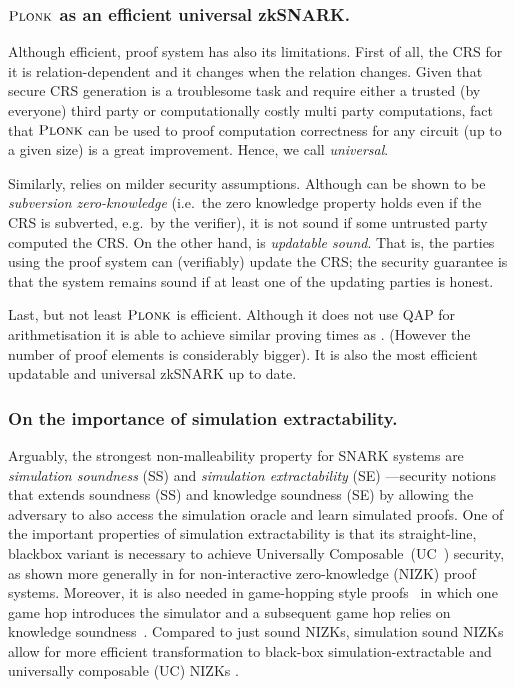 \documentclass[runningheads,11pt]{llncs}
\begin{document}
	\subsubsection*{$\textsc{Plonk}$ as an efficient universal zkSNARK.}
	Although efficient, \groth{} proof system has also its limitations. First of all, the CRS for it is relation-dependent and it changes when the relation changes. Given that secure CRS generation is a troublesome task and require either a trusted (by everyone) third party or computationally costly multi party computations, fact that $\textsc{Plonk}$ can be used to proof computation correctness for any circuit (up to a given size) is a great improvement. Hence, we call \plonk{} \emph{universal}.
	
	Similarly, \plonk{} relies on milder security assumptions. 
	Although \groth{} can be shown to be \emph{subversion zero-knowledge} (i.e.~the zero knowledge property holds even if the CRS is subverted, e.g.~by the verifier), it is not sound if some untrusted party computed the CRS. 
	On the other hand, \plonk{} is \emph{updatable sound}. That is, the parties using the proof system can (verifiably) update the CRS; the security guarantee is that the system remains sound if at least one of the updating parties is honest.
	
	Last, but not least $\textsc{Plonk}$ is efficient. Although it does not use QAP for arithmetisation it is able to achieve similar proving times as \groth{}. (However the number of proof elements is considerably bigger). 
	It is also the most efficient updatable and universal zkSNARK up to date.
	
	\subsubsection*{On the importance of simulation extractability.}
	Arguably, the strongest non-malleability property for SNARK systems are \emph{simulation soundness} (SS) and \emph{simulation extractability} (SE) \cite{FOCS:Sahai99,C:DDOPS01}---security notions that extends soundness (SS) and knowledge soundness (SE) by allowing the adversary to also access the simulation oracle and learn simulated proofs. 
	One of the important properties of simulation extractability is that its
	straight-line, blackbox variant is necessary to achieve Universally Composable~(UC~\cite{FOCS:Canetti01}) security, as shown more generally in 	\cite{STOC:CLOS02,AC:Groth06,EC:GroOstSah06} for non-interactive zero-knowledge (NIZK) proof systems. Moreover, it is also needed in game-hopping style proofs~\cite{EPRINT:Shoup04} in which one game hop
	introduces the simulator and a subsequent game hop relies on knowledge
	soundness~\cite{SP:KMSWP16,CCS:CamDriDub17}.
	Compared to just sound NIZKs, simulation sound NIZKs allow for more efficient transformation to black-box simulation-extractable and universally composable (UC) NIZKs \cite{AFRICACRYPT:Baghery19}. 
\end{document}
